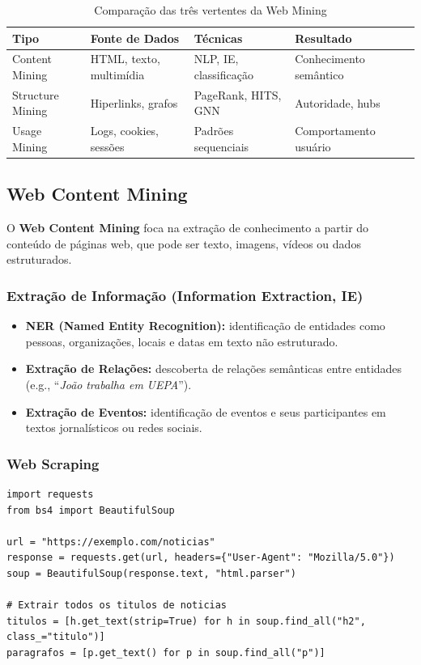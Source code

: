 \documentclass[12pt,a4paper]{article}
\begin{document}
\begin{table}[ht]
\centering
\caption{Comparação das três vertentes da Web Mining}
\begin{tabular}{@{}lllll@{}}
\toprule
\textbf{Tipo} & \textbf{Fonte de Dados} & \textbf{Técnicas} & \textbf{Resultado} \\
\midrule
Content Mining & HTML, texto, multimídia & NLP, IE, classificação & Conhecimento semântico \\
Structure Mining & Hiperlinks, grafos & PageRank, HITS, GNN & Autoridade, hubs \\
Usage Mining & Logs, cookies, sessões & Padrões sequenciais & Comportamento usuário \\
\bottomrule
\end{tabular}
\end{table}

\subsection{Web Content Mining}

O \textbf{Web Content Mining} foca na extração de conhecimento a partir do conteúdo de páginas web, que pode ser texto, imagens, vídeos ou dados estruturados.

\subsubsection{Extração de Informação (Information Extraction, IE)}

\begin{itemize}
  \item \textbf{NER (Named Entity Recognition):} identificação de entidades como pessoas, organizações, locais e datas em texto não estruturado.
  \item \textbf{Extração de Relações:} descoberta de relações semânticas entre entidades (e.g., ``\textit{João} \textit{trabalha em} \textit{UEPA}'').
  \item \textbf{Extração de Eventos:} identificação de eventos e seus participantes em textos jornalísticos ou redes sociais.
\end{itemize}

\subsubsection{Web Scraping}

\begin{lstlisting}[caption={Web scraping com BeautifulSoup}]
import requests
from bs4 import BeautifulSoup

url = "https://exemplo.com/noticias"
response = requests.get(url, headers={"User-Agent": "Mozilla/5.0"})
soup = BeautifulSoup(response.text, "html.parser")

# Extrair todos os titulos de noticias
titulos = [h.get_text(strip=True) for h in soup.find_all("h2", class_="titulo")]
paragrafos = [p.get_text() for p in soup.find_all("p")]
\end{lstlisting}
\end{document}
